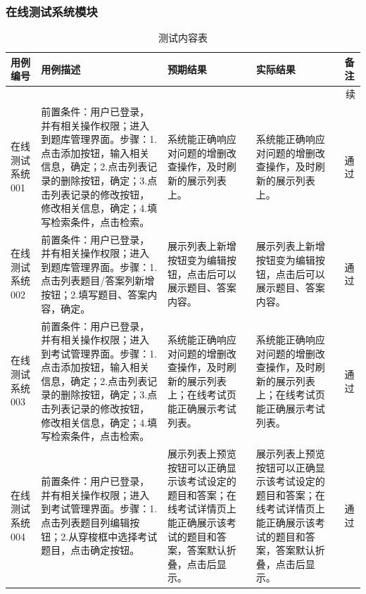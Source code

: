 \documentclass[titlepage,UTF8,linespread=1.5]{ctexart}
\begin{document}
\subsubsection{在线测试系统模块}
\begin{longtable}{|p{4em}|p{14em}|p{7em}|p{7em}|p{2em}|}
    \caption{测试内容表}\label{tab:test_exam}  \\\hline
    用例编号    & 用例描述 & 预期结果 & 实际结果 & 备注 \\\hline
    \endfirsthead
    \multicolumn{5}{r}{{续\tablename\thetable{}}}       \\\hline
    \endhead
    在线测试系统001 &
    前置条件：用户已登录，并有相关操作权限；进入到题库管理界面。步骤：1.点击添加按钮，输入相关信息，确定；2.点击列表记录的删除按钮，确定；3.点击列表记录的修改按钮，修改相关信息，确定；4.填写检索条件，点击检索。 &
    系统能正确响应对问题的增删改查操作，及时刷新的展示列表上。 &
    系统能正确响应对问题的增删改查操作，及时刷新的展示列表上。 &
    通过 \\\hline
    在线测试系统002 &
    前置条件：用户已登录，并有相关操作权限；进入到题库管理界面。步骤：1.点击列表题目/答案列新增按钮；2.填写题目、答案内容，确定。 &
    展示列表上新增按钮变为编辑按钮，点击后可以展示题目、答案内容。 &
    展示列表上新增按钮变为编辑按钮，点击后可以展示题目、答案内容。 &
    通过 \\\hline
    在线测试系统003 &
    前置条件：用户已登录，并有相关操作权限；进入到考试管理界面。步骤：1.点击添加按钮，输入相关信息，确定；2.点击列表记录的删除按钮，确定；3.点击列表记录的修改按钮，修改相关信息，确定；4.填写检索条件，点击检索。 &
    系统能正确响应对问题的增删改查操作，及时刷新的展示列表上；在线考试页能正确展示考试列表。 &
    系统能正确响应对问题的增删改查操作，及时刷新的展示列表上；在线考试页能正确展示考试列表。 &
    通过 \\\hline
    在线测试系统004 &
    前置条件：用户已登录，并有相关操作权限；进入到考试管理界面。步骤：1.点击列表题目列编辑按钮；2.从穿梭框中选择考试题目，点击确定按钮。 &
    展示列表上预览按钮可以正确显示该考试设定的题目和答案；在线考试详情页上能正确展示该考试的题目和答案，答案默认折叠，点击后显示。 &
    展示列表上预览按钮可以正确显示该考试设定的题目和答案；在线考试详情页上能正确展示该考试的题目和答案，答案默认折叠，点击后显示。 &
    通过 \\\hline

\end{longtable}
\end{document}
